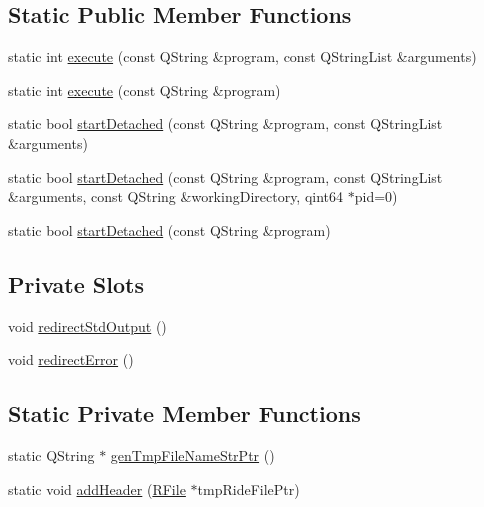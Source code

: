 \subsection*{Static Public Member Functions}
\begin{DoxyCompactItemize}
\item 
static int \hyperlink{class_r_process_a918195aad5effdeaea7dab1166b7dfbe}{execute} (const Q\-String \&program, const Q\-String\-List \&arguments)
\item 
static int \hyperlink{class_r_process_a7ab7291d9b08f84ece34998aada97172}{execute} (const Q\-String \&program)
\item 
static bool \hyperlink{class_r_process_a06adacb5aa5c7fcb6da3e2e69fb58340}{start\-Detached} (const Q\-String \&program, const Q\-String\-List \&arguments)
\item 
static bool \hyperlink{class_r_process_acaf94534843dd204b9c26e3795e6f6a7}{start\-Detached} (const Q\-String \&program, const Q\-String\-List \&arguments, const Q\-String \&working\-Directory, qint64 $\ast$pid=0)
\item 
static bool \hyperlink{class_r_process_a7e114e38627b59250104f6f14425a311}{start\-Detached} (const Q\-String \&program)
\end{DoxyCompactItemize}
\subsection*{Private Slots}
\begin{DoxyCompactItemize}
\item 
void \hyperlink{class_r_process_aa6fbcb33f073336328365a6d9a6e1edb}{redirect\-Std\-Output} ()
\item 
void \hyperlink{class_r_process_a8bb921842cbf1e1577b90b6fc14b0a27}{redirect\-Error} ()
\end{DoxyCompactItemize}
\subsection*{Static Private Member Functions}
\begin{DoxyCompactItemize}
\item 
static Q\-String $\ast$ \hyperlink{class_r_process_a10de16c62d59e6fd06a247de163c8404}{gen\-Tmp\-File\-Name\-Str\-Ptr} ()
\item 
static void \hyperlink{class_r_process_a805afcc35c2f9a5c96ab036286eaff58}{add\-Header} (\hyperlink{class_r_file}{R\-File} $\ast$tmp\-Ride\-File\-Ptr)
\end{DoxyCompactItemize}
